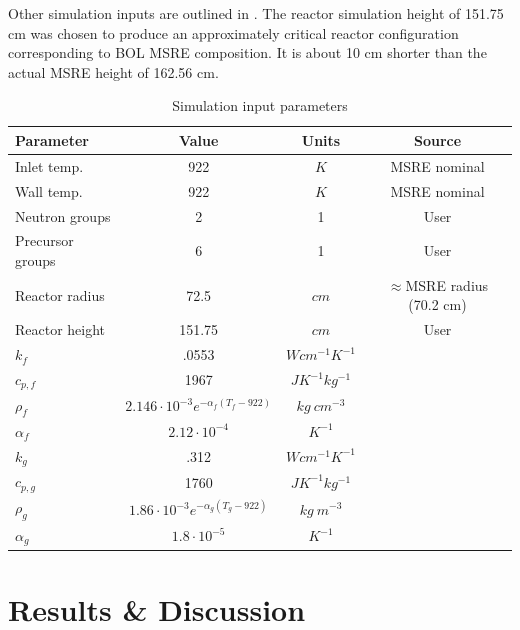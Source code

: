 \documentclass{article}
\let\Oldsection\section
\renewcommand{\section}{\FloatBarrier\Oldsection}
\begin{document}
Other simulation inputs are outlined in .
The reactor simulation height of 151.75 cm was chosen to produce an
approximately critical reactor configuration corresponding to \gls{BOL}
\gls{MSRE} composition. It is about 10 cm shorter than the actual \gls{MSRE}
height of 162.56 cm.

\begin{table}[htpb]
  \begin{center}
    \begin{tabular}{l|c|c|c}
      Parameter & Value & Units & Source\\\hline\hline
      Inlet temp. & 922 & $K$ & \gls{MSRE} nominal \cite{robertson_msre_1965}\\
      Wall temp. & 922 & $K$ & \gls{MSRE} nominal \cite{robertson_msre_1965}\\
      Neutron groups & 2 & 1 & User\\
      Precursor groups & 6 & 1 & User\\
      Reactor radius & 72.5 & $cm$ & $\approx$\gls{MSRE} radius (70.2 cm) \cite{robertson_msre_1965}\\
      Reactor height & 151.75 & $cm$ & User\\
      $k{_f}$ & .0553 & $W cm^{-1} K^{-1}$ & \cite{robertson_msre_1965}\\
      $c_{p,f}$ & 1967 & $J K^{-1} kg^{-1}$ & \cite{robertson_msre_1965}\\
      $\rho_f$ & $2.146\cdot 10^{-3} e^{-\alpha_f (T_f - 922)}$ & $kg\ cm^{-3}$ & \cite{robertson_msre_1965}\\
      $\alpha_f$ & $2.12\cdot 10^{-4}$ & $K^{-1}$ &
      \cite{haubenreich_experience_1970}\\
      $k_g$ & .312 & $W cm^{-1} K^{-1}$ & \cite{cammi_multi-physics_2011}\\
      $c_{p,g}$ & 1760 & $J K^{-1} kg^{-1}$ & \cite{cammi_multi-physics_2011}\\
      $\rho_g$ & $1.86\cdot 10^{-3} e^{-\alpha_g (T_g - 922)}$ & $kg\ m^{-3}$ &
      \cite{robertson_msre_1965}\\
      $\alpha_g$ & $1.8\cdot 10^{-5}$ & $K^{-1}$ &
      \cite{haubenreich_experience_1970}\\
    \end{tabular}
  \end{center}
  \caption{Simulation input parameters}
  \label{table:params}
\end{table}


\section{Results \& Discussion}
\end{document}
